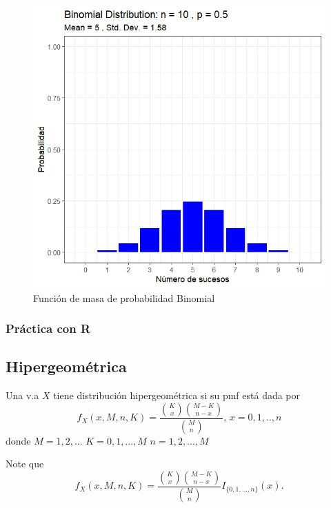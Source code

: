 \begin{i}
\begin{figure}[h!]
\centering
\includegraphics[scale=0.8]{Figuras/Binomial_n10.jpeg}
\caption{Función de masa de probabilidad Binomial}
\end{figure}


\subsubsection{Práctica con R}


\subsection{Hipergeométrica}

\begin{definition}
Una v.a $X$ tiene distribución hipergeométrica si su pmf está dada por 
\begin{equation*}
f_{X}(x,M,n,K)=\frac{\binom{K}{x}\binom{M-K}{n-x}}{\binom{M}{n}}\text{, }%
x=0,1,..,n
\end{equation*}
donde
$M=1,2,...$
$K=0,1,...,M$
$n=1,2,...,M$
\end{definition}

Note que 
\begin{equation*}
f_{X}(x,M,n,K)=\frac{\binom{K}{x}\binom{M-K}{n-x}}{\binom{M}{n}}
I_{\{0,1,...,n\}}(x).
\end{equation*}


\end{i}
